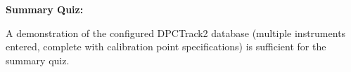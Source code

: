 












\noindent
{\bf Summary Quiz:}

A demonstration of the configured DPCTrack2 database (multiple instruments entered, complete with calibration point specifications) is sufficient for the summary quiz.




